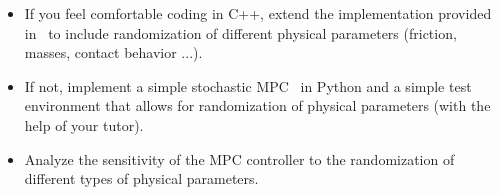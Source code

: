 \documentclass[a4paper]{article}
\begin{document}
\begin{itemize}
  \item If you feel comfortable coding in C++, extend the implementation provided in~\cite{MujocoMPC} to include randomization of different physical parameters (friction, masses, contact behavior ...).
  \item If not, implement a simple stochastic MPC~\cite{Howell2022-uj} in Python and a simple test environment that allows for randomization of physical parameters (with the help of your tutor).
  \item Analyze the sensitivity of the MPC controller to the randomization of different types of physical parameters. 
\end{itemize}




\end{document}
